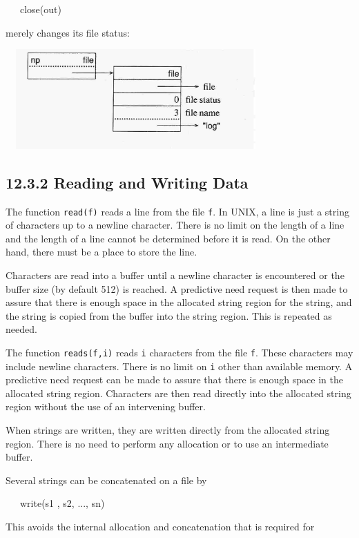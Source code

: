 {\ttfamily\mdseries
\ \ \ close(out)}

\noindent merely changes its file status:

\ \  \includegraphics[width=3.6335in,height=1.5063in]{ib-img/ib-img110.jpg} 

\subsection[12.3.2 Reading and Writing Data]{12.3.2 Reading and Writing Data}

The function \texttt{read(f)} reads a line from the file
\texttt{f}. In UNIX, a line is just a string of characters up to a
newline character. There is no limit on the length of a line and the
length of a line cannot be determined before it is read. On the other
hand, there must be a place to store the line.

Characters are read into a buffer until a newline character is
encountered or the buffer size (by default 512) is reached. A
predictive need request is then made to assure that there is enough
space in the allocated string region for the string, and the string is
copied from the buffer into the string region. This is repeated as
needed.

The function \texttt{reads(f,i)} reads \texttt{i} characters from the
file \texttt{f}. These characters may include newline
characters. There is no limit on \texttt{i} other than available
memory. A predictive need request can be made to assure that there is
enough space in the allocated string region. Characters are then read
directly into the allocated string region without the use of an
intervening buffer.

When strings are written, they are written directly from the allocated
string region. There is no need to perform any allocation or to use an
intermediate buffer.

Several strings can be concatenated on a file by

{\ttfamily\mdseries
\ \ \ write(s1 , s2, ..., sn)}

This avoids the internal allocation and concatenation that is required for

